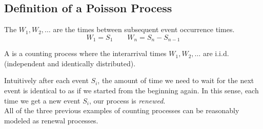 \documentclass{article}
\begin{document}
    \begin{center}
    \end{center}
    \subsection{Definition of a Poisson Process}
    \begin{definition}
        The  $W_1, W_2, \ldots$ are the times between subsequent event occurrence times.
        \[ W_1 = S_1 \qquad W_n = S_n - S_{n-1} \]
    \end{definition}
    \begin{definition}
        A  is a counting process where the interarrival times $W_1, W_2, \ldots$ are i.i.d. (independent and identically distributed).
    \end{definition}
    Intuitively after each event $S_i$, the amount of time we need to wait for the next event is identical to as if we started from the beginning again. In this sense, each time we get a new event $S_i$, our process is \textit{renewed}.\\

    All of the three previous examples of counting processes  can be reasonably modeled as renewal processes.
\end{document}
